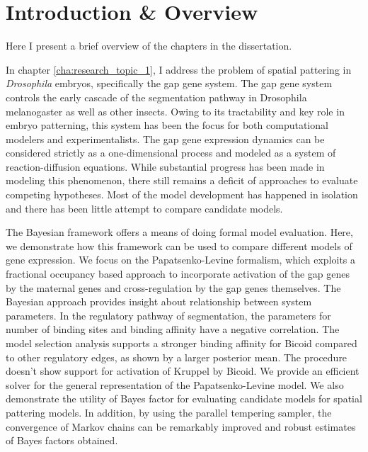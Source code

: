 \chapter{Introduction \& Overview}
\label{cha:introduction}




Here I present a brief overview of the chapters in the dissertation. 


In chapter \ref{cha:research_topic_1}, I address the problem of spatial pattering in \emph{Drosophila} embryos, specifically the gap gene system. The gap gene system controls the early cascade of the segmentation pathway in Drosophila melanogaster as well as other insects. Owing to its tractability and key role in embryo patterning, this system has been the focus for both computational modelers and experimentalists. The gap gene expression dynamics can be considered strictly as a one-dimensional process and modeled as a system of reaction-diffusion equations. While substantial progress has been made in modeling this phenomenon, there still remains a deficit of approaches to evaluate competing hypotheses. Most of the model development has happened in isolation and there has been little attempt to compare candidate models.

The Bayesian framework offers a means of doing formal model evaluation. Here, we demonstrate how this framework can be used to compare different models of gene expression. We focus on the Papatsenko-Levine formalism, which exploits a fractional occupancy based approach to incorporate activation of the gap genes by the maternal genes and cross-regulation by the gap genes themselves. The Bayesian approach provides insight about relationship between system parameters. In the regulatory pathway of segmentation, the parameters for number of binding sites and binding affinity have a negative correlation. The model selection analysis supports a stronger binding affinity for Bicoid compared to other regulatory edges, as shown by a larger posterior mean. The procedure doesn’t show support for activation of Kruppel by Bicoid.
We provide an efficient solver for the general representation of the Papatsenko-Levine model. We also demonstrate the utility of Bayes factor for evaluating candidate models for spatial pattering models. In addition, by using the parallel tempering sampler, the convergence of Markov chains can be remarkably improved and robust estimates of Bayes factors obtained.

